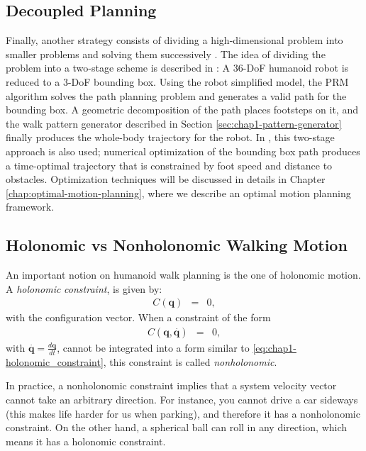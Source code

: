 \subsection{Decoupled Planning}
\label{subsec:chap1-bounding-box}

Finally, another strategy consists of dividing a high-dimensional
problem into smaller problems and solving them successively
\cite{zhan09}. The idea of dividing the problem into a two-stage
scheme is described in \cite{yosh08}: A 36-DoF humanoid robot is
reduced to a 3-DoF bounding box. Using the robot simplified model, the
PRM algorithm solves the path planning problem and generates a valid
path for the bounding box. A geometric decomposition of the path
places footsteps on it, and the walk pattern generator described in
Section \ref{sec:chap1-pattern-generator} finally produces the
whole-body trajectory for the robot. In \cite{moul10}, this two-stage
approach is also used; numerical optimization of the bounding box path
produces a time-optimal trajectory that is constrained by foot speed
and distance to obstacles. Optimization techniques will be discussed
in details in Chapter \ref{chap:optimal-motion-planning}, where we
describe an optimal motion planning framework.

\subsection{Holonomic vs Nonholonomic Walking Motion}
\label{subsec:chap1-holonomic}

An important notion on humanoid walk planning is the one of holonomic
motion.
A \emph{holonomic} \emph{constraint}, is given by:
\begin{eqnarray} C(\mathbf{q}) & = & 0,
  \label{eq:chap1-holonomic_constraint}
\end{eqnarray}
with \config{} the configuration vector. When a constraint of the form
\begin{eqnarray}
  C(\mathbf{q,}\overset{.}{\mathbf{q}}) & = & 0,
\end{eqnarray}
with $\mathbf{\overset{.}{\mathbf{q}}=}\frac{d\mathbf{q}}{dt}$, cannot
be integrated into a form similar to \ref{eq:chap1-holonomic_constraint},
this constraint is called \emph{nonholonomic}.

In practice, a nonholonomic constraint implies that a system velocity
vector cannot take an arbitrary direction. For instance, you cannot
drive a car sideways (this makes life harder for us when parking), and
therefore it has a nonholonomic constraint. On the other hand, a
spherical ball can roll in any direction, which means it has a
holonomic constraint.

